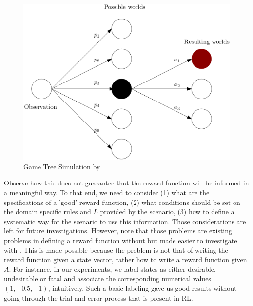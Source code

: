 \begin{figure}[H]
  \centering
  \includegraphics[scale=0.5]{figures/scworlds.png}
  \caption{Game Tree Simulation by \dio}
  \label{fig:diosim}
\end{figure}

Observe how this does not guarantee that the reward function will be informed in a meaningful way.
To that end, we need to consider (1) what are the specifications of a 'good' reward function, (2) what conditions should be set 
on the domain specific rules and $L$ provided by the scenario, (3) how to define a systematic way for the scenario to use 
this information. Those considerations are left for future
investigations. However, note that those problems are existing problems in defining a reward function 
without \dio but made easier to investigate with \dio. This is made possible because the problem 
is not that of writing the reward function given a state vector, rather how to write a reward function given 
$A$. For instance, in our experiments, we label states as either desirable, undesirable or fatal and associate 
the corresponding numerical values $(1,-0.5, -1)$, intuitively. Such a basic labeling gave us good results without 
going through the trial-and-error process that is present in RL. 
